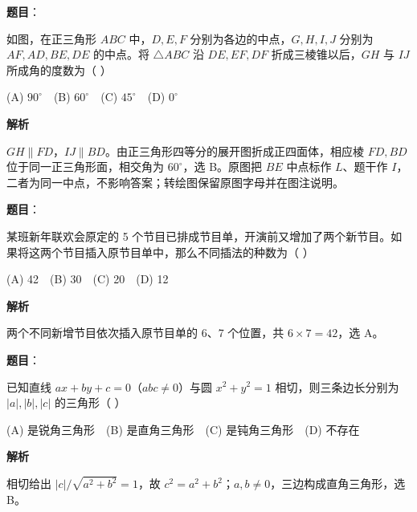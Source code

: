 \begin{answer}

\textbf{题目}：

如图，在正三角形 $ABC$ 中，$D,E,F$ 分别为各边的中点，\newline $G,H,I,J$ 分别为 $AF,AD,BE,DE$ 的中点。将 $\triangle ABC$ 沿 $DE,EF,DF$ 折成三棱锥以后，$GH$ 与 $IJ$ 所成角的度数为（ ）
\nopagebreak[4]
\begin{center}\end{center}
\nopagebreak[4]
   (A) $90^\circ$　(B) $60^\circ$　(C) $45^\circ$　(D) $0^\circ$

\textbf{解析}

$GH\parallel FD$，$IJ\parallel BD$。由正三角形四等分的展开图折成正四面体，相应棱 $FD,BD$ 位于同一正三角形面，相交角为 $60^\circ$，选 B。原图把 $BE$ 中点标作 $L$、题干作 $I$，二者为同一中点，不影响答案；转绘图保留原图字母并在图注说明。


\end{answer}
\begin{answer}

\textbf{题目}：

某班新年联欢会原定的 5 个节目已排成节目单，开演前又增加了两个新节目。如果将这两个节目插入原节目单中，那么不同插法的种数为（ ）

   (A) 42　(B) 30　(C) 20　(D) 12

\textbf{解析}

两个不同新增节目依次插入原节目单的 6、7 个位置，共 $6\times7=42$，选 A。


\end{answer}
\begin{answer}

\textbf{题目}：

已知直线 $ax+by+c=0$（$abc\ne0$）与圆 $x^2+y^2=1$ 相切，则三条边长分别为 $|a|,|b|,|c|$ 的三角形（ ）

    (A) 是锐角三角形　(B) 是直角三角形　(C) 是钝角三角形　(D) 不存在

\textbf{解析}

相切给出 $|c|/\sqrt{a^2+b^2}=1$，故 $c^2=a^2+b^2$；$a,b\ne0$，三边构成直角三角形，选 B。


\end{answer}
